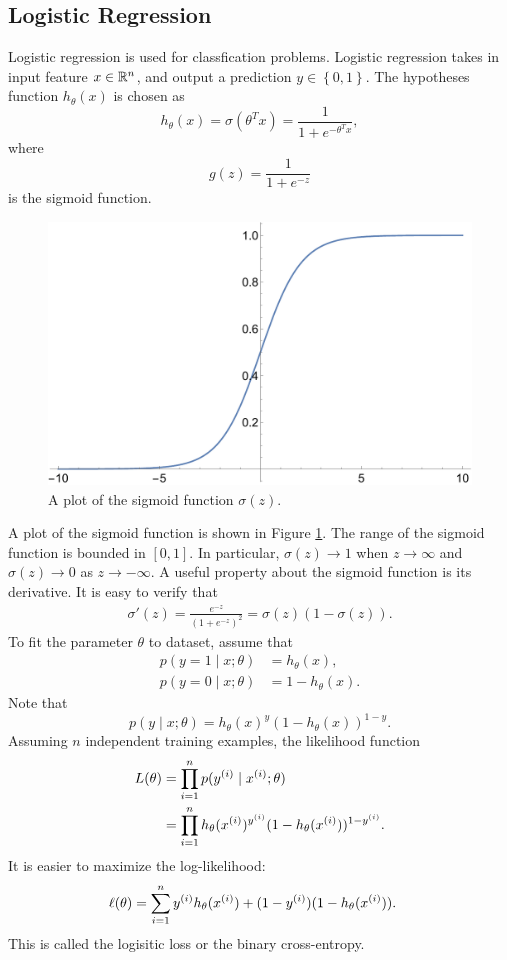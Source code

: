 \documentclass[a4paper]{article}
\begin{document}
\subsection{Logistic Regression}
Logistic regression is used for classfication problems.
Logistic regression takes in input feature $x \in \mathbb{R}^n$, and 
output a prediction $y \in \left\{ 0, 1 \right\}$. 
The hypotheses function $h_{\theta}(x)$ is chosen as 
\[
h_\theta(x) = \sigma(\theta^T x) = \frac{1}{1 + e^{- \theta^T x}},
\]
where 
\[
g(z) = \frac{1}{1 + e^{-z}}
\]
is the sigmoid function. 
\begin{figure}[H]
  \centering
  \includegraphics[width=0.5\linewidth]{fig/sigmoid.pdf}
  \caption{A plot of the sigmoid function $\sigma(z)$.}
  \label{sigmoid}
\end{figure}
A plot of the sigmoid function is shown in Figure 
\ref{sigmoid}. The range of the sigmoid function is bounded
in $[0, 1]$. In particular, $\sigma(z) \to 1$ when $z \to \infty$
and $\sigma(z) \to 0$ as $z \to - \infty$. A useful property
about the sigmoid function is its derivative. It is easy 
to verify that 
\[
\begin{aligned}
  \sigma'(z) 
  = \frac{e^{-z}}{(1 + e^{-z})^2}
  = \sigma(z) (1 - \sigma(z)).
\end{aligned}
\]
To fit the parameter $\theta$ to dataset, assume that 
\[
\begin{aligned}
  p(y = 1 \mid x ; \theta) &= h_\theta(x), \\
  p(y = 0 \mid x ; \theta) &= 1 - h_\theta(x).
\end{aligned}
\]
Note that 
\[
p(y \mid x; \theta) = h_\theta(x)^y (1 - h_\theta(x))^{1 - y}.
\]
Assuming $n$ independent training examples, the likelihood 
function 
\[
\begin{aligned}
  L(\theta) &= \prod_{i=1}^n p(y^{(i)} \mid x^{(i)} ; \theta) \\
  &= \prod_{i=1}^n h_\theta(x^{(i)})^{y^{(i)}} (1 - h_\theta(x^{(i)}))^{1 - y^{(i)}}.
\end{aligned}
\]
It is easier to maximize the log-likelihood: 
\[
\begin{aligned}
  \ell(\theta) &= \sum_{i=1}^n 
  y^{(i)} h_\theta(x^{(i)}) + (1 - y^{(i)}) (1 - h_\theta(x^{(i)})).
\end{aligned}
\]
This is called the logisitic loss or the binary cross-entropy.
\end{document}
